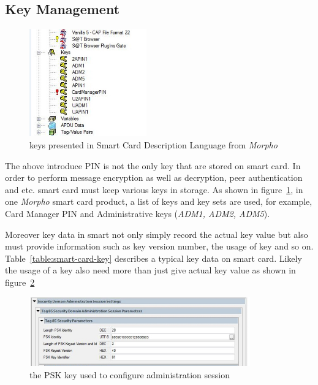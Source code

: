 \subsection{Key Management}

 \begin{figure}[!htbp]
	\centering
	\includegraphics[width=0.45\textwidth]{smart-card-key.jpg}
		\caption{keys presented in Smart Card Description Language from \emph{Morpho}}
	\label{fig:smart-card-key}
\end{figure}

The above introduce PIN is not the only key that are stored on smart card. In order to perform message encryption as well as decryption, peer authentication and etc. smart card must keep various keys in storage. As shown in figure~\ref{fig:smart-card-key}, in one \emph{Morpho} smart card product, a list of keys and key sets are used, for example, Card Manager PIN and Administrative keys (\emph{ADM1, ADM2, ADM5}).

Moreover key data in smart not only simply record the actual key value but also must provide information such as key version number, the usage of key and so on. Table~\ref{table:smart-card-key} describes a typical key data on smart card. Likely the usage of a key also need more than just give  actual key value as shown in figure~\ref{fig:smart-card-key-use}

 \begin{figure}[!htbp]
	\centering
	\includegraphics[width=0.85\textwidth]{smart-card-key-use.jpg}
		\caption{the PSK key used to configure administration session}
	\label{fig:smart-card-key-use}
\end{figure}

